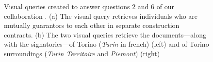 \begin{figure}[!ht]
    \caption{Visual queries created to answer questions 2 and 6 of our collaboration \pascal. (a) The visual query retrieves individuals who are mutually guarantors to each other in separate construction contracts.
        (b) The two visual queries retrieve the documents---along with the signatories---of Torino (\textit{Turin} in french) (left) and of Torino surroundings (\textit{Turin Territoire} and \textit{Piemont}) (right)}\label{fig:visualQueriesExamples}
\end{figure}


%
%



